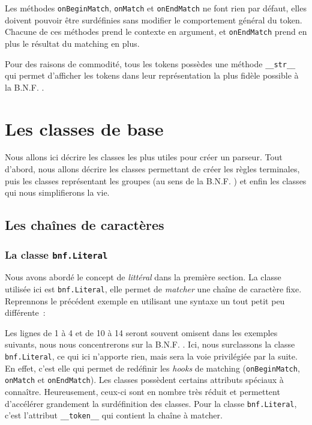 \documentclass[a4paper]{article}
\newcommand{\fixed}[1]{\texttt{#1}}
\newcommand{\bnf}{B.N.F. }
\begin{document}
            \noindent
            Les méthodes \fixed{onBeginMatch}, \fixed{onMatch} et
            \fixed{onEndMatch} ne font rien par défaut, elles doivent pouvoir être
            surdéfinies sans modifier le comportement général du token. Chacune
            de ces méthodes prend le contexte en argument, et \fixed{onEndMatch}
            prend en plus le résultat du matching en plus.

            Pour des raisons de commodité, tous les tokens possèdes une méthode
            \fixed{\_\_str\_\_} qui permet d'afficher les tokens dans leur
            représentation la plus fidèle possible à la \bnf.

    \newpage
    \section{Les classes de base}
        Nous allons ici décrire les classes les plus utiles pour créer un parseur.
        Tout d'abord, nous allons décrire les classes permettant de créer les
        règles terminales, puis les classes représentant les groupes (au sens de
        la \bnf) et enfin les classes qui nous simplifierons la vie.

        \subsection{Les chaînes de caractères}

            \subsubsection{La classe \fixed{bnf.Literal}}
                Nous avons abordé le concept de \emph{littéral} dans la première
                section. La classe utilisée ici est \fixed{bnf.Literal}, elle permet
                de \emph{matcher} une chaîne de caractère fixe. Reprennons le précédent
                exemple en utilisant une syntaxe un tout petit peu différente~:

                Les lignes de 1 à 4 et de 10 à 14 seront souvent omisent dans
                les exemples suivants,
                nous nous concentrerons sur la \bnf. Ici, nous surclassons la
                classe \fixed{bnf.Literal}, ce qui ici n'apporte rien, mais sera
                la voie privilégiée par la suite. En effet, c'est elle
                qui permet de redéfinir les \emph{hooks} de matching
                (\fixed{onBeginMatch}, \fixed{onMatch} et \fixed{onEndMatch}).
                Les classes possèdent certains attributs spéciaux à connaître.
                Heureusement, ceux-ci sont en nombre très réduit et permettent
                d'accélérer grandement la surdéfinition des classes. Pour la classe
                \fixed{bnf.Literal}, c'est l'attribut \fixed{\_\_token\_\_} qui
                contient la chaîne à matcher.
\end{document}
